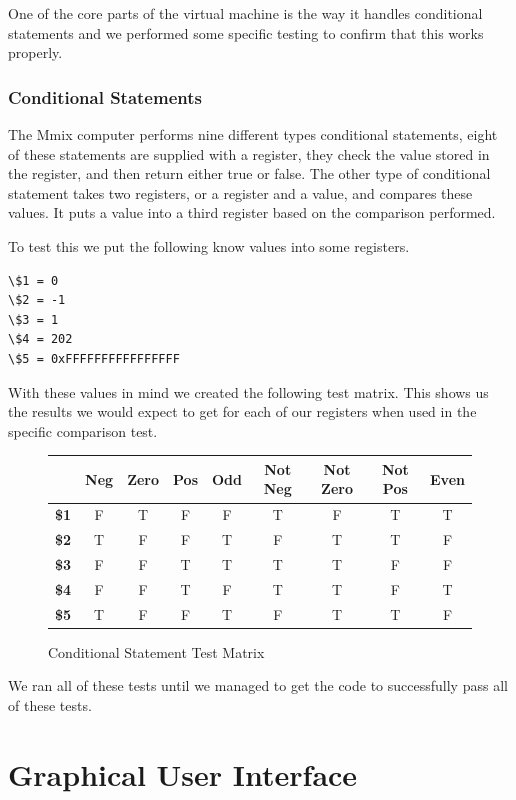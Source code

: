 \documentclass[a4paper,11pt]{report}
\begin{document}
One of the core parts of the virtual machine is the way it handles conditional statements and we performed some specific testing to confirm that this works properly.
\subsection{Conditional Statements}
The Mmix computer performs nine different types conditional statements, eight of these statements are supplied with a register, they check the value stored in the register, and then return either true or false. The other type of conditional statement takes two registers, or a register and a value, and compares these values. It puts a value into a third register based on the comparison performed.

To test this we put the following know values into some registers.

\begin{lstlisting}
\$1 = 0
\$2 = -1
\$3 = 1
\$4 = 202
\$5 = 0xFFFFFFFFFFFFFFFF
\end{lstlisting}
\clearpage
With these values in mind we created the following test matrix. This shows us the results we would expect to get for each of our registers when used in the specific comparison test.
\begin{figure}[ht!]
\begin{center}
\begin{tabular}{| l | c | c  | c | c  | c | c  | c | c  |}
\hline
 & \textbf{Neg} & \textbf{Zero} & \textbf{Pos} & \textbf{Odd} & \textbf{Not Neg} & \textbf{Not Zero} & \textbf{Not Pos} & \textbf{Even}\\ \hline
\textbf{\$1} & F & T & F & F & T & F & T & T\\ \hline
\textbf{\$2} & T & F & F & T & F & T & T & F\\ \hline
\textbf{\$3} & F & F & T & T & T & T & F & F\\ \hline
\textbf{\$4} & F & F & T & F & T & T & F & T\\ \hline
\textbf{\$5} & T & F & F & T & F & T & T & F\\ \hline
\end{tabular}
\end{center}
\caption{Conditional Statement Test Matrix}
\end{figure}

We ran all of these tests until we managed to get the code to successfully pass all of these tests.

\chapter{Graphical User Interface}
\end{document}

